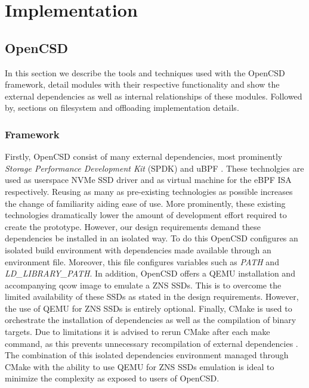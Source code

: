 
\chapter{Implementation} %



\ifpdf
    \graphicspath{{7/figures/PNG/}{7/figures/PDF/}{7/figures/}}
\else
    \graphicspath{{7/figures/EPS/}{7/figures/}}
\fi

\section{OpenCSD}

In this section we describe the tools and techniques used with the OpenCSD
framework, detail modules with their respective functionality and show the
external dependencies as well as internal relationships of these modules. 
Followed by, sections on filesystem and offloading implementation details.

\subsection{Framework}

Firstly, OpenCSD consist of many external dependencies, most prominently
\textit{Storage Performance Development Kit} (SPDK) \cite{spdk} and uBPF
\cite{ubpf}. These technolgies are used as userspace NVMe SSD driver and as
virtual machine for the eBPF ISA respectively. Reusing as many as pre-existing
technologies as possible increases the change of familiarity aiding ease of use.
More prominently, these existing technologies dramatically lower the amount of
development effort required to create the prototype. However, our design
requirements demand these dependencies be installed in an isolated way. To do
this OpenCSD configures an isolated build environment with dependencies made
available through an environment file. Moreover, this file configures variables
such as \textit{PATH} and \textit{LD\_LIBRARY\_PATH}. In addition, OpenCSD
offers a QEMU installation and accompanying qcow image to emulate a ZNS SSDs.
This is to overcome the limited availability of these SSDs as stated in the
design requirements. However, the use of QEMU for ZNS SSDs is entirely optional.
Finally, CMake \cite{cmake} is used to orchestrate the installation of
dependencies as well as the compilation of binary targets. Due to limitations it
is advised to rerun CMake after each make command, as this  prevents unnecessary
recompilation of external dependencies \footnotemark[10]. The combination of this
isolated dependencies environment managed through CMake with the ability to use
QEMU for ZNS SSDs emulation is ideal to minimize the complexity as exposed to
users of OpenCSD.


